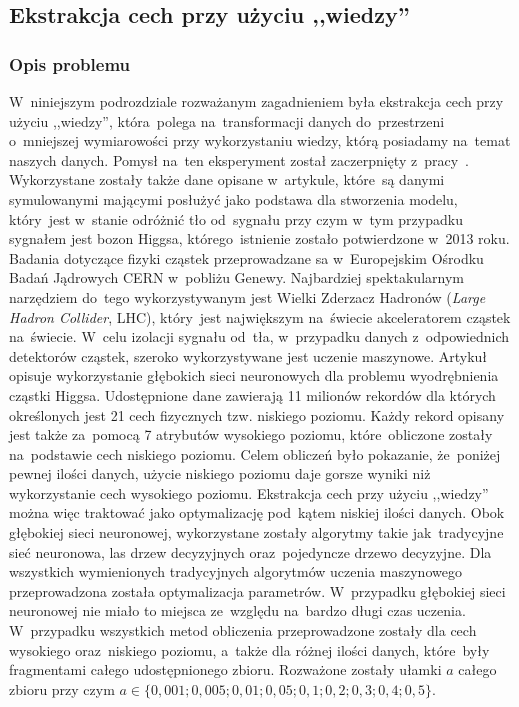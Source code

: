 \subsection{Ekstrakcja cech przy użyciu ,,wiedzy''}
\subsubsection{Opis problemu}
W~niniejszym podrozdziale rozważanym zagadnieniem była ekstrakcja cech przy użyciu ,,wiedzy'', która~polega na~transformacji danych do~przestrzeni o~mniejszej wymiarowości przy wykorzystaniu wiedzy, którą posiadamy na~temat naszych danych. Pomysł na~ten eksperyment został zaczerpnięty z~pracy~\cite{higgs1}. Wykorzystane zostały także dane opisane w~artykule, które~są danymi symulowanymi mającymi posłużyć jako podstawa dla stworzenia modelu, który~jest w~stanie odróżnić tło od~sygnału przy czym w~tym przypadku sygnałem jest bozon Higgsa, którego~istnienie zostało potwierdzone w~2013 roku. 
Badania dotyczące fizyki cząstek przeprowadzane sa  w~Europejskim Ośrodku Badań Jądrowych CERN w~pobliżu Genewy. Najbardziej spektakularnym narzędziem do~tego wykorzystywanym jest Wielki Zderzacz Hadronów (\textit{Large Hadron Collider}, LHC), który~jest największym na~świecie akceleratorem cząstek na~świecie. W~celu izolacji sygnału od~tła, w~przypadku danych z~odpowiednich detektorów cząstek, szeroko wykorzystywane jest uczenie maszynowe. Artykuł opisuje wykorzystanie głębokich sieci neuronowych dla problemu wyodrębnienia cząstki Higgsa. Udostępnione dane zawierają 11 milionów rekordów dla których określonych jest 21 cech fizycznych tzw. niskiego poziomu. Każdy rekord opisany jest także za~pomocą 7 atrybutów wysokiego poziomu, które~obliczone zostały na~podstawie cech niskiego poziomu. Celem obliczeń było pokazanie, że~poniżej pewnej ilości danych, użycie niskiego poziomu daje gorsze wyniki niż wykorzystanie cech wysokiego poziomu. Ekstrakcja cech przy użyciu ,,wiedzy'' można więc traktować jako optymalizację pod~kątem niskiej ilości danych. Obok głębokiej sieci neuronowej, wykorzystane zostały algorytmy takie jak~tradycyjne sieć neuronowa, las drzew decyzyjnych oraz~pojedyncze drzewo decyzyjne. Dla wszystkich wymienionych tradycyjnych algorytmów uczenia maszynowego przeprowadzona została optymalizacja parametrów. W~przypadku głębokiej sieci neuronowej nie miało to miejsca ze~względu na~bardzo długi czas uczenia. W~przypadku wszystkich metod obliczenia przeprowadzone zostały dla cech wysokiego oraz~niskiego poziomu, a~także dla różnej ilości danych, które~były fragmentami całego udostępnionego zbioru. Rozważone zostały ułamki $a$ całego zbioru przy czym $a\in\{0,001; 0,005; 0,01; 0,05; 0,1; 0,2; 0,3; 0,4; 0,5\}$. 

